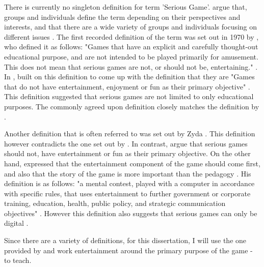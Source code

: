 \documentclass[a4paper,11.5pt]{report}
\numberwithin{figure}{section}
\numberwithin{table}{section}
\numberwithin{equation}{section}
\numberwithin{equation}{section}
\begin{document}
There is currently no singleton definition for term 'Serious Game'. \citeauthor{Johann2015} argue that, groups and individuals define the term depending on their perspectives and interests, and that there are a wide variety of groups and individuals focusing on different issues \citep{Johann2015}. The first recorded definition of the term was set out in 1970 by \citeauthor{abt1970} \citep{Wilkinson2016}, who defined it as follows: "Games that have an explicit and carefully thought-out educational purpose, and are not intended to be played primarily for amusement. This does not mean that serious games are not, or should not be, entertaining." \citep{abt1970}. In \citeyear{Michael2005}, \citeauthor{Michael2005} built on this definition to come up with the definition that they are "Games that do not have entertainment, enjoyment or fun as their primary objective" \citep{Michael2005}. This definition suggested that serious games are not limited to only educational purposes. The commonly agreed upon definition closely matches the definition by \citeauthor{Michael2005} \citep[see][]{Johann2015}.

Another definition that is often referred to was set out by Zyda \citep[see][]{Johann2015}. This definition however contradicts the one set out by \citeauthor{Michael2005} \citep{Johann2015}. In contrast, \citeauthor{Michael2005} argue that serious games should not, have entertainment or fun as their primary objective. On the other hand, \citeauthor{Zyda2005} expressed that the entertainment component of the game should come first, and also that the story of the game is more important than the pedagogy \citep{Zyda2005}. His definition is as follows: "a mental contest, played with a computer in accordance with specific rules, that uses entertainment to further government or corporate training, education, health, public policy, and strategic communication objectives" \citep{Zyda2005}. However this definition also suggests that serious games can only be digital \citep{Jean}. 

Since there are a variety of definitions, for this dissertation, I will use the one provided by \citeauthor{abt1970} and work entertainment around the primary purpose of the game - to teach.

\end{document}
